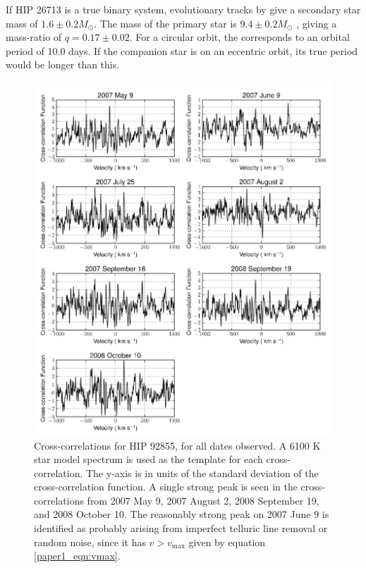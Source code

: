 If HIP 26713 is a true binary system, evolutionary tracks by \cite
{Landin2008} give a secondary star mass of $1.6 \pm 0.2 M_{\odot}$. 
The mass of the primary star is $9.4 \pm 0.2 M_{\odot}$ \citep
{Tetzlaff2010}, giving a mass-ratio of $q = 0.17 \pm 0.02$. For a circular orbit, the corresponds to an orbital period of 10.0 days. If the companion star is on an eccentric orbit, its true period would be longer than this.

\begin{figure}[t]
  \centering
  \includegraphics[width=5.7in]{Figures/paper1_fig5.pdf}
  \caption{Cross-correlations for HIP 92855, for all dates observed. A 6100 K star model spectrum is used as the template for each cross-correlation. The y-axis is in units of
    the standard deviation of the cross-correlation function. A single strong peak is seen in the
    cross-correlations from 2007 May 9, 2007 August 2, 2008 September
    19, and 2008 October 10. The reasonably strong peak on 2007 June 9 is identified
  as probably arising from imperfect telluric line removal or random noise, since it
  has $v>v_\mathrm{max}$ given by equation \ref{paper1_eqn:vmax}.}
  \label{paper1_fig:hip92855}
\end{figure}




